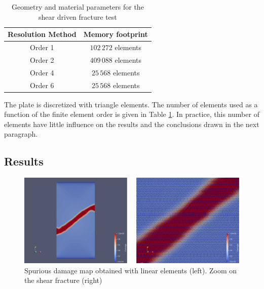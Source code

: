 \begin{table}[H]
    \centering
    \begin{tabular}{||c c||} 
        \hline
        Resolution Method & Memory footprint
        \\
        [0.5ex] 
        \hline\hline
        Order 1 & \(102\,272\) elements
        \\ \hline
        Order 2 & \(409\,088\) elements
        \\ \hline
        Order 4 & \(25\,568\) elements 
        \\ \hline
        Order 6 & \(25\,568\) elements 
        \\ \hline
    \end{tabular}
    \caption{Geometry and material parameters for the shear driven fracture test}
    \label{tbl:micromorphicdamage:shear_driven_fracture_test_elements}
\end{table}

The plate is discretized with triangle elements. The number of elements
used as a function of the finite element order is given in Table
\ref{tbl:micromorphicdamage:shear_driven_fracture_test_elements}. In
practice, this number of elements have little influence on the results
and the conclusions drawn in the next paragraph.

\subsection{Results}

\begin{figure}[H]
  \centering
  \includegraphics[width=10.cm]{../chapter_02_ef_micromorphic/figures/shear-driven-fracture-damage-results-order-1.pdf}
  \caption{Spurious damage map obtained with linear elements (left). Zoom on the shear fracture (right)}
  \label{fig:micromorphicdamage:shear_driven_fracture_test_order1}
\end{figure}


